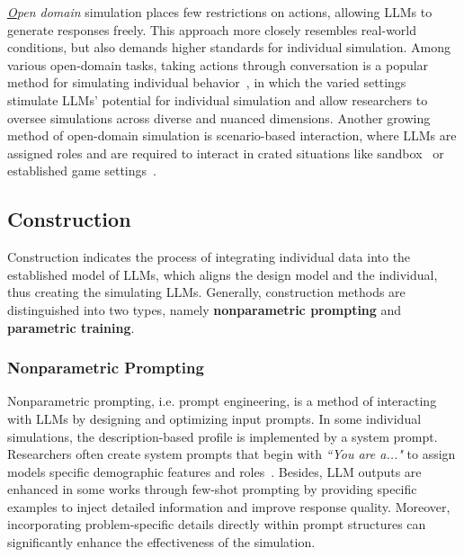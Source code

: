 \textit{{\ul Open domain}} simulation places few restrictions on actions, allowing LLMs to generate responses freely. This approach more closely resembles real-world conditions, but also demands higher standards for individual simulation. Among various open-domain tasks, taking actions through conversation is a popular method for simulating individual behavior~\cite{brahman2021letcharacterstellstory,li2023chatharuhirevivinganimecharacter,zhou2023characterglmcustomizingchineseconversational,yu2024neekoleveragingdynamiclora}, in which the varied settings stimulate LLMs’ potential for individual simulation and allow researchers to oversee simulations across diverse and nuanced dimensions. Another growing method of open-domain simulation is scenario-based interaction, where LLMs are assigned roles and are required to interact in crated situations like sandbox~\cite{wang2023voyageropenendedembodiedagent,lin2023agentsimsopensourcesandboxlarge} or established game settings~\cite{light2023avalonbenchevaluatingllmsplaying,chalamalasetti2023clembenchusinggameplay}.


\subsection{Construction}\label{subsec:indi_cons}

Construction indicates the process of integrating individual data into the established model of LLMs, which aligns the design model and the individual, thus creating the simulating LLMs. Generally, construction methods are distinguished into two types, namely \textbf{nonparametric prompting} and \textbf{parametric training}.

\subsubsection{Nonparametric Prompting}

Nonparametric prompting, i.e. prompt engineering, is a method of interacting with LLMs by designing and optimizing input prompts. In some individual simulations, the description-based profile is implemented by a system prompt. Researchers often create system prompts that begin with \textit{``You are a..."} to assign models specific demographic features and roles~\cite{deshpande2023toxicitychatgptanalyzingpersonaassigned}. Besides, LLM outputs are enhanced in some works through few-shot prompting by providing specific examples to inject detailed information and improve response quality. Moreover, incorporating problem-specific details directly within prompt structures can significantly enhance the effectiveness of the simulation.


